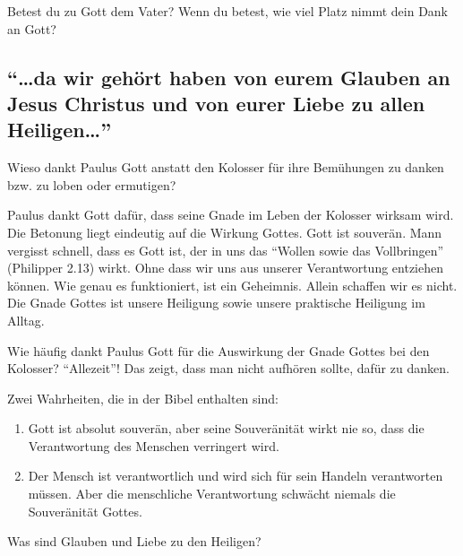 \documentclass[
  12pt,
]{krantz}
\makeatletter
\providecommand{\tightlist}{%
  \setlength{\itemsep}{0pt}\setlength{\parskip}{0pt}}
\newenvironment{kframe}{%
\medskip{}
\setlength{\fboxsep}{.8em}
 \def\at@end@of@kframe{}%
 \ifinner\ifhmode%
  \def\at@end@of@kframe{\end{minipage}}%
  \begin{minipage}{\columnwidth}%
 \fi\fi%
 \def\FrameCommand##1{\hskip\@totalleftmargin \hskip-\fboxsep
 \colorbox{shadecolor}{##1}\hskip-\fboxsep
     \hskip-\linewidth \hskip-\@totalleftmargin \hskip\columnwidth}%
 \MakeFramed {\advance\hsize-\width
   \@totalleftmargin\z@ \linewidth\hsize
   \@setminipage}}%
 {\par\unskip\endMakeFramed%
 \at@end@of@kframe}
\newenvironment{rmdblock}[1]
  {
  \begin{itemize}
  \renewcommand{\labelitemi}{
    \raisebox{-.7\height}[0pt][0pt]{
      {\setkeys{Gin}{width=3em,keepaspectratio}\texttt{[image: img/\#1]}}
    }
  }
  \setlength{\fboxsep}{1em}
  \begin{kframe}
  \item
  }
  {
  \end{kframe}
  \end{itemize}
  }
\newenvironment{rmdquestion}
  {\begin{rmdblock}{question}}
  {\end{rmdblock}}
\newenvironment{rmddefinition}
  {\begin{rmdblock}{definition}}
  {\end{rmdblock}}
\makeatother
\begin{document}
\begin{rmdquestion}
Betest du zu Gott dem Vater? Wenn du betest, wie viel Platz nimmt dein
Dank an Gott?
\end{rmdquestion}

\hypertarget{da-wir-gehuxf6rt-haben-von-eurem-glauben-an-jesus-christus-und-von-eurer-liebe-zu-allen-heiligen}{%
\subsection{\texorpdfstring{``\ldots da wir gehört haben von eurem Glauben an Jesus Christus und von eurer Liebe zu allen Heiligen\ldots{}''}{``\ldots da wir gehört haben von eurem Glauben an Jesus Christus und von eurer Liebe zu allen Heiligen\ldots''}}\label{da-wir-gehuxf6rt-haben-von-eurem-glauben-an-jesus-christus-und-von-eurer-liebe-zu-allen-heiligen}}

Wieso dankt Paulus Gott anstatt den Kolosser für ihre Bemühungen zu danken bzw. zu loben oder ermutigen?

Paulus dankt Gott dafür, dass seine Gnade im Leben der Kolosser wirksam wird. Die Betonung liegt eindeutig auf die Wirkung Gottes. Gott ist souverän. Mann vergisst schnell, dass es Gott ist, der in uns das ``Wollen sowie das Vollbringen'' (Philipper 2.13) wirkt. Ohne dass wir uns aus unserer Verantwortung entziehen können. Wie genau es funktioniert, ist ein Geheimnis. Allein schaffen wir es nicht. Die Gnade Gottes ist unsere Heiligung sowie unsere praktische Heiligung im Alltag.

Wie häufig dankt Paulus Gott für die Auswirkung der Gnade Gottes bei den Kolosser?
``Allezeit''! Das zeigt, dass man nicht aufhören sollte, dafür zu danken.

\begin{rmddefinition}
Zwei Wahrheiten, die in der Bibel enthalten sind:

\begin{enumerate}
\def\labelenumi{\arabic{enumi}.}
\tightlist
\item
  Gott ist absolut souverän, aber seine Souveränität wirkt nie so, dass
  die Verantwortung des Menschen verringert wird.
\item
  Der Mensch ist verantwortlich und wird sich für sein Handeln
  verantworten müssen. Aber die menschliche Verantwortung schwächt
  niemals die Souveränität Gottes.
\end{enumerate}
\end{rmddefinition}

Was sind Glauben und Liebe zu den Heiligen?
\end{document}
